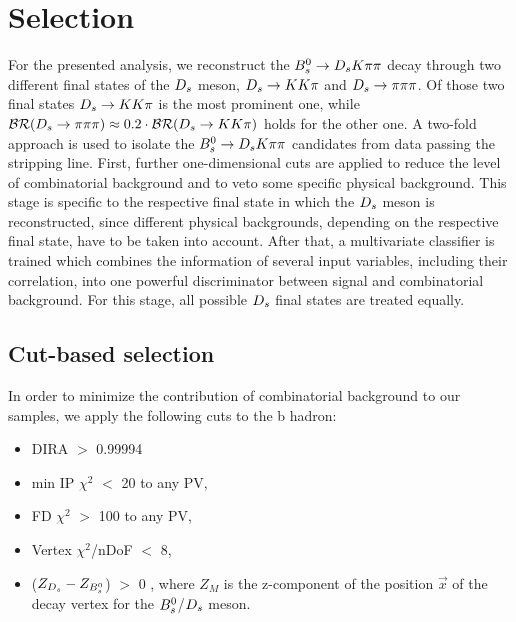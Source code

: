 
\section{Selection}
\label{sec:Selection}

For the presented analysis, we reconstruct the ${{B}^0_{s}}\rightarrow{\ensuremath{{D}_{s}}}{\ensuremath{K}}{\ensuremath{\pi}}{\ensuremath{\pi}}$ decay through two different final states of the ${{D}_{s}}$ meson, ${{D}_{s}}\rightarrow{\ensuremath{K}}{\ensuremath{K}}{\ensuremath{\pi}}$ and ${{D}_{s}}\rightarrow{\ensuremath{\pi}}{\ensuremath{\pi}}{\ensuremath{\pi}}$.
Of those two final states ${{D}_{s}}\rightarrow{\ensuremath{K}}{\ensuremath{K}}{\ensuremath{\pi}}$ is the most prominent one,
while $\mathcal{BR}({{D}_{s}}\rightarrow{\ensuremath{\pi}}{\ensuremath{\pi}}{\ensuremath{\pi}}) \approx 0.2\cdot\mathcal{BR}({{D}_{s}}\rightarrow{\ensuremath{K}}{\ensuremath{K}}{\ensuremath{\pi}})$ holds for the other one. \newline
A two-fold approach is used to isolate the ${{B}^0_{s}}\rightarrow{\ensuremath{{D}_{s}}}{\ensuremath{K}}{\ensuremath{\pi}}{\ensuremath{\pi}}$ candidates from data passing the stripping line. 
First, further one-dimensional cuts are applied to reduce the level of combinatorial background and to veto some specific physical background. 
This stage is specific to the respective final state in which the ${{D}_{s}}$ meson is reconstructed, since different physical backgrounds, depending on the respective final state, have to be taken into account.   
After that, a multivariate classifier is trained which combines the information of several input variables, including their correlation, into one powerful discriminator
between signal and combinatorial background. For this stage, all possible ${{D}_{s}}$ final states are treated equally. 

\subsection{Cut-based selection}

In order to minimize the contribution of combinatorial background to our samples, we apply the following cuts to the b hadron:

\begin{itemize}

\item DIRA $>$ 0.99994

\item min IP $\chi^{2}$ $<$ 20 to any PV,

\item FD $\chi^{2}$ $>$ 100 to any PV,

\item Vertex $\chi^{2}$/nDoF $<$ 8,

\item ($Z_{{{D}_{s}}}-Z_{{{B}^0_{s}}}$) $>$ 0 , where $Z_{M}$ is the z-component of the position $\vec{x}$ of the decay vertex for the ${{B}^0_{s}}$/${{D}_{s}}$ meson.

\end{itemize}    


